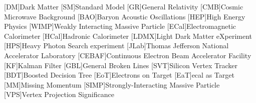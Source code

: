 
\usepackage{epsfig} %
\usepackage{epic} %
\usepackage{eepic} %
\usepackage{url} %
\usepackage{longtable} %
\usepackage{mathrsfs} %
\usepackage{multirow} %
\usepackage{bigstrut} %
\usepackage{amssymb} %
\usepackage{graphicx} %
\usepackage{setspace} %
\usepackage{xspace} %
\usepackage{amsmath} %
\usepackage{siunitx} %
\usepackage{booktabs} %
\usepackage{hyperref} %
\usepackage{subcaption}
\usepackage{graphicx} %

\usepackage[noabbrev,capitalise]{cleveref} %

\newcommand{\creflastconjunction}{, and } %

\usepackage[compat=1.1.0]{tikz-feynman} %

\usepackage{hepunits}

\newcommand{\fourgev}{\qty{4}{GeV}\xspace}
\newcommand{\eightgev}{\qty{8}{GeV}\xspace}
\newcommand{\ecal}{ECal}
\newcommand{\hcal}{HCal}

\usepackage{acronym}
[DM]{Dark Matter}
[SM]{Standard Model}
[GR]{General Relativity}
[CMB]{Cosmic Microwave Background}
[BAO]{Baryon Acoustic Oscillations}
[HEP]{High Energy Physics}
[WIMP]{Weakly Interacting Massive Particle}
[ECal]{Electromagnetic Calorimeter}
[HCal]{Hadronic Calorimeter}
[LDMX]{Light Dark Matter eXperiment}
[HPS]{Heavy Photon Search experiment}
[JLab]{Thomas Jefferson National Accelerator Laboratory}
[CEBAF]{Continuous Electron Beam Accelerator Facility}
[KF]{Kalman Filter}
[GBL]{General Broken Lines}
[SVT]{Silicon Vertex Tracker}
[BDT]{Boosted Decision Tree}
[EoT]{Electrons on Target}
[EaT]{\ac{ecal} as Target}
[MM]{Missing Momentum}
[SIMP]{Strongly-Interacting Massive Particle}
[VPS]{Vertex Projection Significance}

